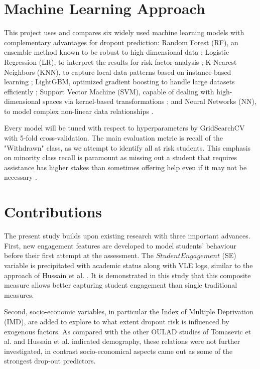 \documentclass[ %
                    author={Carlos Duran Calle},
                supervisor={Dr. Felipe Campelo},
                    degree={MSc},
                     title={Comparative Machine Learning Analysis for Student Dropout Prediction in a Virtual Learning Environment},
                  subtitle={Incorporating Student Engagement and Socio-Economic Features},
                      type={},
                      year={2025}]{dissertation}
\begin{document}
\section{Machine Learning Approach}
This project uses and compares six widely used machine learning models with complementary advantages for dropout prediction: Random Forest (RF), an ensemble method known to be robust to high-dimensional data \cite{breiman_rf_2001}; Logistic Regression (LR), to interpret the results for risk factor analysis \cite{harrell_LR_2015}; K-Nearest Neighbors (KNN), to capture local data patterns based on instance-based learning \cite{cover_nearest_1967}; LightGBM, optimized gradient boosting to handle large datasets efficiently \cite{ke_lightgbm_2017}; Support Vector Machine (SVM), capable of dealing with high-dimensional spaces via kernel-based transformations \cite{cortes_svm_1995}; and Neural Networks (NN), to model complex non-linear data relationships \cite{lecun_nn_gradient-applied_1998}.

Every model will be tuned with respect to hyperparameters by GridSearchCV with 5-fold cross-validation. The main evaluation metric is recall of the "Withdrawn" class, as we attempt to identify all at risk students. This emphasis on minority class recall is paramount as missing out a student that requires assistance has higher stakes than sometimes offering help even if it may not be necessary \cite{sokolova_classification_tasks_2009}.

\section{Contributions}
The present study builds upon existing research with three important advances. First, new engagement features are developed to model students' behaviour before their first attempt at the assessment. The $Student Engagement$ (SE) variable is precipitated with academic status along with VLE logs, similar to the approach of Hussain et al. \cite{hussain_student_engagement_prediction_2018}. It is demonstrated in this study that this composite measure allows better capturing student engagement than single traditional measures.

Second, socio-economic variables, in particular the Index of Multiple Deprivation (IMD), are added to explore to what extent dropout risk is influenced by exogenous factors. As compared with the other OULAD studies of Tomasevic et al. \cite{tomasevic_comparison_supervised_data_2020} and Hussain et al. \cite{hussain_student_engagement_prediction_2018} indicated demography, these relations were not further investigated, in contrast socio-economical aspects came out as some of the strongest drop-out predictors.
\end{document}
